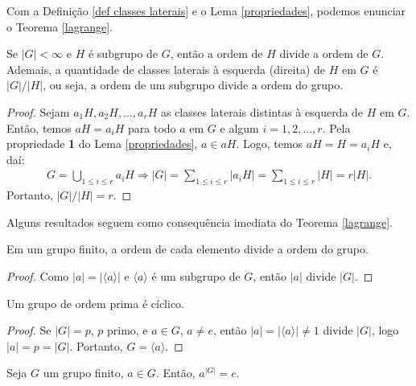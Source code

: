 	Com a Definição \ref{def classes laterais} e o 
	Lema \ref{propriedades}, podemos enunciar o Teorema \ref{lagrange}.
	\begin{theorem}[Lagrange]
	\label{lagrange}
		Se $|G|<\infty$ e $H$ é subgrupo de $G$, então a ordem de $H$ divide 
		a ordem de $G$. Ademais, a quantidade de classes laterais à esquerda
		(direita) de $H$ em $G$ é $|G|/|H|$, ou seja, a ordem de um subgrupo
		divide a ordem do grupo. 
	\end{theorem}
	\begin{proof}
		Sejam $a_1H, a_2H, \dots , a_rH$ as classes laterais distintas à
		esquerda de $H$ em $G$. Então, temos $aH = a_iH$ para todo $a$ em 
		$G$ e algum $i = 1,2,\dots,r$. Pela propriedade \textbf{1} do 
		Lema \ref{propriedades}, $a\in aH$. Logo, temos $aH = H = a_iH$ 
		e, daí:
		\begin{align*}
		    G = \bigcup_{1\leq i\leq r}^{}a_iH \Rightarrow |G| 
		    = \sum_{1\leq i\leq r}^{}|a_iH| = \sum_{1\leq i\leq r}|H| 
		    = r|H|.
		\end{align*} 
		Portanto, $|G|/|H| = r$.
	\end{proof}
	Alguns resultados seguem como consequência imediata 
	do Teorema \ref{lagrange}.
	\begin{corollary}
	\label{c2}
		Em um grupo finito, a ordem de cada elemento divide a ordem do grupo.
	\end{corollary}
	\begin{proof}
		Como $|a| = |\langle a\rangle|$ e $\langle a \rangle$ é um subgrupo 
		de $G$, então $|a|$ divide $|G|$. 
	\end{proof}
	\begin{corollary}
	\label{c3}
		Um grupo de ordem prima é cíclico.
	\end{corollary}
	\begin{proof}
		Se $|G| = p$, $p$ primo, e $a\in G$, $a\neq e$, então 
		$|a| = |\langle a\rangle | \neq 1$ divide $|G|$, logo 
		$|a| = p = |G|$. Portanto, $G = \langle a\rangle$. 
	\end{proof}
	\begin{corollary}
	\label{c4}
		Seja $G$ um grupo finito, $a\in G$. Então, $a^{|G|} = e.$
	\end{corollary}
	
